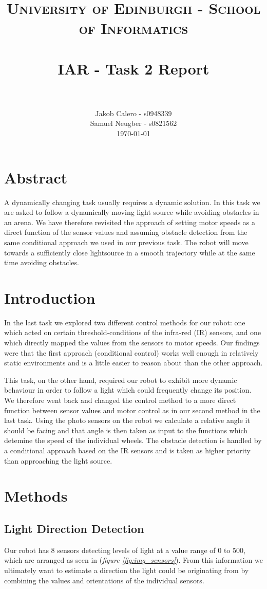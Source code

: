 \documentclass[paper=a4, fontsize=12pt]{scrartcl}	%
\title{
\vspace{-1in} 	
\usefont{OT1}{bch}{b}{n}
\normalfont \normalsize \textsc{University of Edinburgh - School of Informatics}
\\ [25pt]
\horrule{0.5pt} \\[0.4cm]
\large IAR - Task 2 Report \\
\horrule{1pt} \\[0.5cm]
}
\author{
  \normalfont \normalsize
  Jakob Calero - s0948339\\[-3pt]\normalsize
  Samuel Neugber - s0821562\\[-3pt]\normalsize
  \today
}
\date{}
\numberwithin{equation}{section}		%
\numberwithin{figure}{section}			%
\numberwithin{table}{section}				%
\begin{document}
\maketitle					%
\section{Abstract}
A dynamically changing task usually requires a dynamic solution. In this task we are asked to follow a dynamically moving light source while avoiding obstacles in an arena. We have therefore revisited the approach of setting motor speeds as a direct function of the sensor values and assuming obstacle detection from the same conditional approach we used in our previous task. The robot will move towards a sufficiently close lightsource in a smooth trajectory while at the same time avoiding obstacles.

\section{Introduction}
In the last task we explored two different control methods for our robot: one which acted on certain threshold-conditions of the infra-red (IR) sensors, and one which directly mapped the values from the sensors to motor speeds. Our findings were that the first approach (conditional control) works well enough in relatively static environments and is a little easier to reason about than the other approach.

This task, on the other hand, required our robot to exhibit more dynamic behaviour in order to follow a light which could frequently change its position. We therefore went back and changed the control method to a more direct function between sensor values and motor control as in our second method in the last task. Using the photo sensors on the robot we calculate a relative angle it should be facing and that angle is then taken as input to the functions which detemine the speed of the individual wheels. The obstacle detection is handled by a conditional approach based on the IR sensors and is taken as higher priority than approaching the light source.

\section{Methods} 
\subsection{Light Direction Detection}
\label{LDD}
Our robot has 8 sensors detecting levels of light at a value range of 0 to 500, which are arranged as seen in (\emph{figure \ref{fig:img_sensors}}). From this information we ultimately want to estimate a direction the light could be originating from by combining the values and orientations of the individual sensors.
\end{document}
